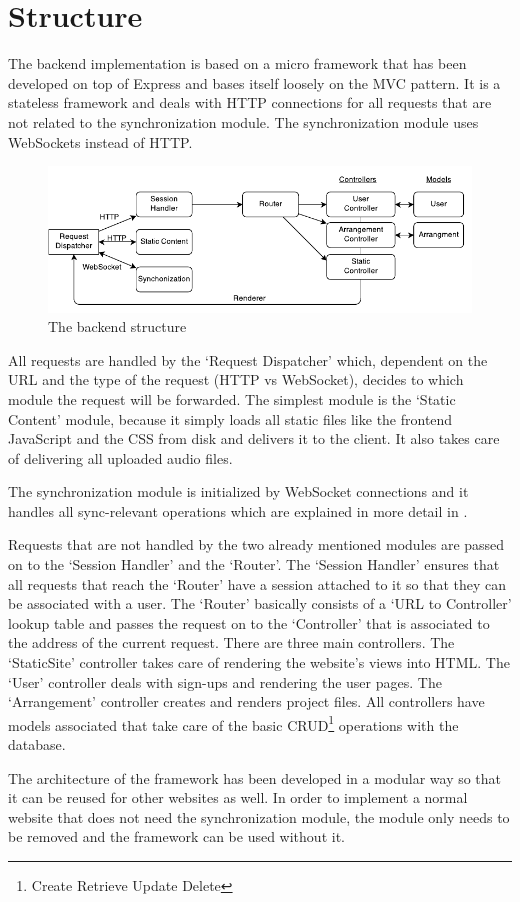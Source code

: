 \section{Structure}

The backend implementation is based on a micro framework that has been developed on top of Express and bases itself loosely on the MVC pattern. It is a stateless framework and deals with HTTP connections for all requests that are not related to the synchronization module. The synchronization module uses WebSockets instead of HTTP.

\begin{figure}[htb]
  \centerline{\includegraphics[width=\linewidth]{images/BackendDiagram.pdf}}
  \caption[The backend structure]{The backend structure}
  \label{fig:backend-structure}
\end{figure}

All requests are handled by the `Request Dispatcher' which, dependent on the URL and the type of the request (HTTP vs WebSocket), decides to which module the request will be forwarded. The simplest module is the `Static Content' module, because it simply loads all static files like the frontend JavaScript and the CSS from disk and delivers it to the client. It also takes care of delivering all uploaded audio files.

The synchronization module is initialized by WebSocket connections and it handles all sync-relevant operations which are explained in more detail in .

Requests that are not handled by the two already mentioned modules are passed on to the `Session Handler' and the `Router'. The `Session Handler' ensures that all requests that reach the `Router' have a session attached to it so that they can be associated with a user. The `Router' basically consists of a `URL to Controller' lookup table and passes the request on to the `Controller' that is associated to the address of the current request. There are three main controllers. The `StaticSite' controller takes care of rendering the website's views into HTML. The `User' controller deals with sign-ups and rendering the user pages. The `Arrangement' controller creates and renders project files. All controllers have models associated that take care of the basic CRUD\footnote{Create Retrieve Update Delete} operations with the database.

The architecture of the framework has been developed in a modular way so that it can be reused for other websites as well. In order to implement a normal website that does not need the synchronization module, the module only needs to be removed and the framework can be used without it.